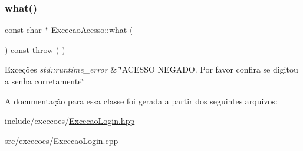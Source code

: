 \subsubsection{\texorpdfstring{what()}{what()}}
{\footnotesize\ttfamily const char $\ast$ Excecao\+Acesso\+::what (\begin{DoxyParamCaption}{ }\end{DoxyParamCaption}) const throw ( ) \hspace{0.3cm}{\ttfamily [virtual]}}


\begin{DoxyExceptions}{Exceções}
{\em std\+::runtime\+\_\+error} & \char`\"{}\+A\+C\+E\+S\+S\+O N\+E\+G\+A\+D\+O. Por favor confira se digitou a senha corretamente\char`\"{} \\
\hline
\end{DoxyExceptions}


A documentação para essa classe foi gerada a partir dos seguintes arquivos\+:\begin{DoxyCompactItemize}
\item 
include/excecoes/\mbox{\hyperlink{_excecao_login_8hpp}{Excecao\+Login.\+hpp}}\item 
src/excecoes/\mbox{\hyperlink{_excecao_login_8cpp}{Excecao\+Login.\+cpp}}\end{DoxyCompactItemize}
